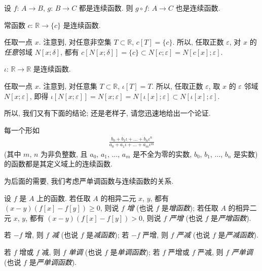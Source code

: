 \begin{theorem}
    设 $f$: $A \to B$, $g$: $B \to C$ 都是连续函数. 则 $g \circ f$: $A \to C$ 也是连续函数.
\end{theorem}

\begin{example}
    常函数 $c$: $\mathbb{R} \to \{ c \}$ 是连续函数.

    任取一点 $x$. 注意到, 对任意非空集 $T \subset \mathbb{R}$, $c[T] = \{ c \}$. 所以, 任取正数 $\varepsilon$, 对 $x$ 的\emph{任意}邻域 $N[x; \delta]$, 都有 $c[N[x; \delta]] = \{ c \} \subset N[c; \varepsilon] = N[c[x]; \varepsilon]$.
\end{example}

\begin{example}
    $\iota$: $\mathbb{R} \to \mathbb{R}$ 是连续函数.

    任取一点 $x$. 注意到, 对任意集 $T \subset \mathbb{R}$, $\iota[T] = T$. 所以, 任取正数 $\varepsilon$, 取 $x$ 的 $\varepsilon$ 邻域 $N[x; \varepsilon]$, 即得 $\iota[N[x; \varepsilon]] = N[x; \varepsilon] = N[\iota[x]; \varepsilon] \subset N[\iota[x]; \varepsilon]$.
\end{example}

所以, 我们又有下面的结论; 还是老样子, 请您迅速地给出一个论证.

\begin{theorem}
    每一个形如
    \begin{align*}
        \frac{b_0 + b_1 \iota + \dots + b_n \iota^n}{a_0 + a_1 \iota + \dots + a_m \iota^m}
    \end{align*}
    (其中 $m$, $n$ 为非负整数, 且 $a_0$, $a_1$, $\dots$, $a_m$ 是不全为零的实数, $b_0$, $b_1$, $\dots$, $b_n$ 是实数) 的函数都是其定义域上的连续函数.
\end{theorem}

为后面的需要, 我们考虑严单调函数与连续函数的关系.

\begin{definition}
    设 $f$ 是 $A$ 上的函数. 若任取 $A$ 的相异二元 $x$, $y$, 都有 $(x - y)(f[x] - f[y]) \geq 0$, 则说 $f$ \emph{增} (也说 $f$ 是\emph{增函数}); 若任取 $A$ 的相异二元 $x$, $y$, 都有 $(x - y)(f[x] - f[y]) > 0$, 则说 $f$ \emph{严增} (也说 $f$ 是\emph{严增函数}).

    若 $-f$ 增, 则 $f$ \emph{减} (也说 $f$ 是\emph{减函数}); 若 $-f$ 严增, 则 $f$ \emph{严减} (也说 $f$ 是\emph{严减函数}).

    若 $f$ 增或 $f$ 减, 则 $f$ \emph{单调} (也说 $f$ 是\emph{单调函数}); 若 $f$ 严增或 $f$ 严减, 则 $f$ \emph{严单调} (也说 $f$ 是\emph{严单调函数}).
\end{definition}


